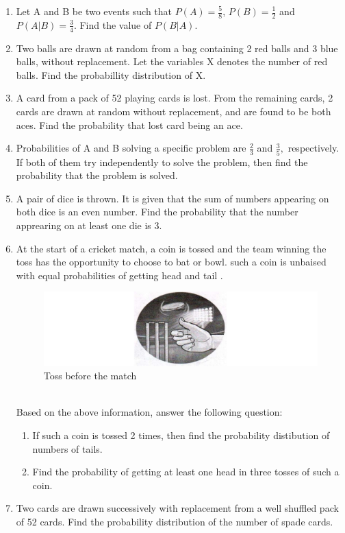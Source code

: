 \begin{enumerate}
\item Let A and B be two events such that $P(A) = \frac{5}{8}$, $P(B) = \frac{1}{2}$ and  $P(A|B) = \frac{3}{4}$. Find the value of $P(B|A)$.
\item Two balls are drawn at random from a bag containing 2 red balls and 3 blue balls, without replacement. Let the variables X denotes the number of red balls. Find the probabillity distribution of X.
\item A card from a pack of 52 playing cards is lost. From the remaining cards, 2 cards are drawn at random without replacement, and are found to be both aces. Find the probability that lost card being an ace.
\item Probabilities of A and B solving a specific problem are $\frac{2}{3}$ and $\frac{3}{5},$ respectively. If both of them try independently to solve the problem, then find the probability that the problem is  solved.
\item A pair of dice is thrown. It is given that the sum of numbers  appearing on both dice is an even number. Find the probability that the number apprearing on at least one die is 3.
\item At the start of a cricket match, a coin is tossed and the team winning the toss has the opportunity to choose to bat or bowl. such a coin is unbaised with equal probabilities of getting head and tail .
\begin{figure}[!ht]
\centering
\includegraphics[width=\columnwidth]{figs/coin}
\caption{Toss before the match}
\label{fig:coin1}
\end{figure}
\\ Based on the above information, answer the following question:
\begin{enumerate}
\item If such a coin is tossed 2 times, then find the probability distibution of numbers of tails.
\item Find the probability of getting at least one head in three tosses of such a coin.
\end{enumerate}
\item Two cards are drawn successively with replacement from a well shuffled pack of 52 cards. Find the probability distribution of the number of spade cards.

\end{enumerate}

